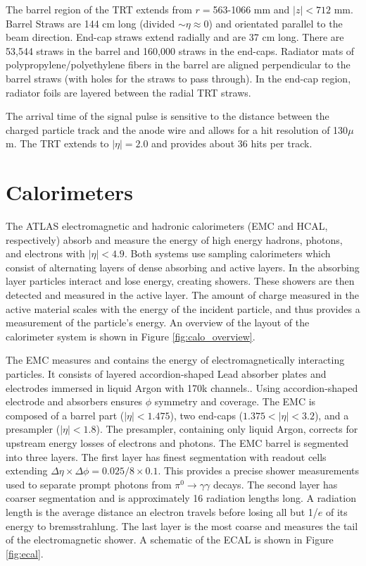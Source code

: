 The barrel region of the TRT extends from $r=$563-1066 mm and $|z| < 712$ mm. Barrel Straws are 144 cm long (divided  $\sim \eta \approx 0$) and orientated parallel to the beam direction. End-cap straws extend radially and are 37 cm long. There are 53,544 straws in the barrel and 160,000 straws in the end-caps. Radiator mats of polypropylene/polyethylene fibers in the barrel are aligned perpendicular to the barrel straws (with holes for the straws to pass through). In the end-cap region, radiator foils are layered between the radial TRT straws. 

The arrival time of the signal pulse is sensitive to the distance between the charged particle track and the anode wire and allows for a hit resolution of 130$\mu$m. The TRT extends to $|\eta| = 2.0$ and provides about 36 hits per track.
\section{Calorimeters}
The ATLAS electromagnetic and hadronic calorimeters (EMC and HCAL, respectively) absorb and measure the energy of high energy hadrons, photons, and electrons with $|\eta| < 4.9$. Both systems use sampling calorimeters which consist of alternating layers of dense absorbing and active layers. In the absorbing layer particles interact and lose energy, creating showers. These showers are then detected and measured in the active layer. The amount of charge measured in the active material scales with the energy of the incident particle, and thus provides a measurement of the particle's energy. An overview of the layout of the calorimeter system is shown in Figure \ref{fig:calo_overview}.

The EMC measures and contains the energy of electromagnetically interacting particles. It consists of layered accordion-shaped Lead absorber plates and electrodes immersed in liquid Argon with 170k channels.. Using accordion-shaped electrode and absorbers ensures $\phi$ symmetry and coverage. The EMC is composed of a barrel part ($|\eta| < 1.475$), two end-caps ($1.375<|\eta| < 3.2$), and a presampler ($|\eta| < 1.8$).  The presampler, containing only liquid Argon, corrects for upstream energy losses of electrons and photons. The EMC barrel is segmented into three layers. The first layer has finest segmentation with readout cells extending $\Delta \eta \times \Delta \phi = 0.025/8 \times 0.1$. This provides a precise shower measurements used to separate prompt photons from $\pi^{0} \rightarrow \gamma \gamma$ decays. The second layer has coarser segmentation and is approximately 16 radiation lengths long. A radiation length is the average distance an electron travels before losing all but 1/$e$ of its energy to bremsstrahlung. The last layer is the most coarse and measures the tail of the electromagnetic shower. A schematic of the ECAL is shown in Figure \ref{fig:ecal}. 

